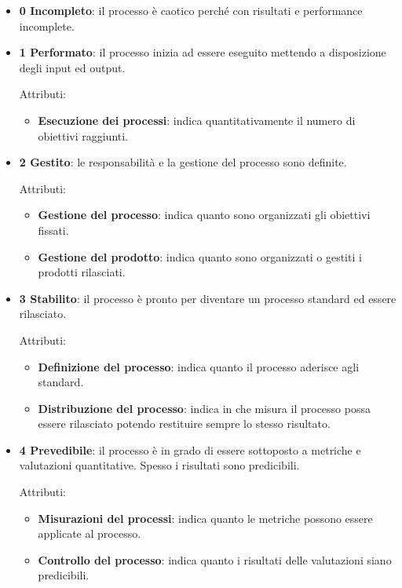 	\begin{itemize}
		\item \textbf{0 Incompleto}: il processo è caotico perché con risultati e performance incomplete.
	
		\item \textbf{1 Performato}: il processo inizia ad essere eseguito mettendo a disposizione degli input ed output.
		
		Attributi:
		
		\begin{itemize}
			\item \textbf{Esecuzione dei processi}: indica quantitativamente il numero di obiettivi raggiunti.
		\end{itemize}
	
		\item \textbf{2 Gestito}: le responsabilità e la gestione del processo sono definite.
		
		Attributi:
		
		\begin{itemize}
			\item \textbf{Gestione del processo}: indica quanto sono organizzati gli obiettivi fissati.
			\item \textbf{Gestione del prodotto}: indica quanto sono organizzati o gestiti i prodotti rilasciati.
		\end{itemize}
	
		\item \textbf{3 Stabilito}: il processo è pronto per diventare un processo standard ed essere rilasciato.
		
		Attributi:
		
		\begin{itemize}
			\item \textbf{Definizione del processo}: indica quanto il processo aderisce agli standard.
			\item \textbf{Distribuzione del processo}: indica in che misura il processo possa essere rilasciato potendo restituire sempre lo stesso risultato.
		\end{itemize}
	
		\item \textbf{4 Prevedibile}: il processo è in grado di essere sottoposto a metriche e valutazioni quantitative. Spesso i risultati sono predicibili.
		
		Attributi:
		
		\begin{itemize}
			\item \textbf{Misurazioni del processi}: indica quanto le metriche possono essere applicate al processo.
			\item \textbf{Controllo del processo}: indica quanto i risultati delle valutazioni siano predicibili.
		\end{itemize}
	

\end{itemize}
